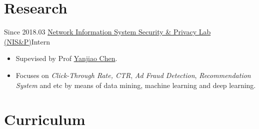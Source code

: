 \documentclass[letterpaper]{twentysecondcv} %
\begin{document}

\section{Research}


\small{Since 2018.03} \quad \href{http://nisplab.whu.edu.cn/index.html}{Network Information System Security \& Privacy Lab (NIS\&P)}\hfill Intern
\begin{itemize}
	\item Supevised by Prof \href{http://iqua.ece.toronto.edu/ychen/}{Yanjiao Chen}.
	\item Focuses on \emph{Click-Through Rate, CTR}, \emph{Ad Fraud Detection}, 
	\emph{Recommendation System} and etc by means of data mining, machine learning and deep learning.
\end{itemize}


\section{Curriculum}
\end{document}
